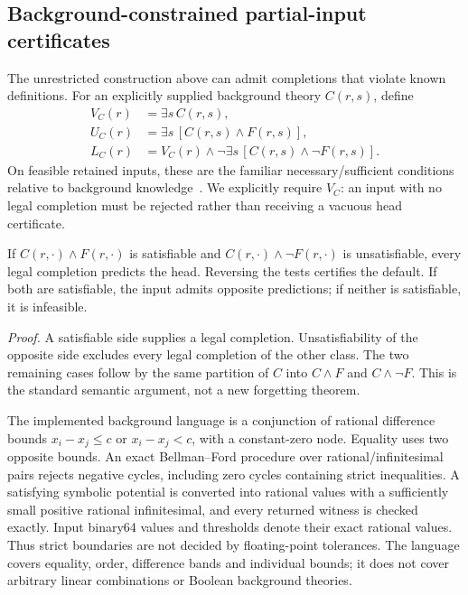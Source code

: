 \subsection{Background-constrained partial-input certificates}\label{sec:contextual-forgetting}
The unrestricted construction above can admit completions that violate known definitions. For an explicitly supplied background theory $C(r,s)$, define
\begin{align}
 V_C(r)&=\exists s\,C(r,s),\\
 U_C(r)&=\exists s\,[C(r,s)\land F(r,s)],\\
 L_C(r)&=V_C(r)\land\neg\exists s\,[C(r,s)\land\neg F(r,s)].
\end{align}
On feasible retained inputs, these are the familiar necessary/sufficient conditions relative to background knowledge~\citep{doherty2024dualforgetting}. We explicitly require $V_C$: an input with no legal completion must be rejected rather than receiving a vacuous head certificate.

\begin{proposition}
If $C(r,\cdot)\land F(r,\cdot)$ is satisfiable and $C(r,\cdot)\land\neg F(r,\cdot)$ is unsatisfiable, every legal completion predicts the head. Reversing the tests certifies the default. If both are satisfiable, the input admits opposite predictions; if neither is satisfiable, it is infeasible.
\end{proposition}
\noindent\emph{Proof.} A satisfiable side supplies a legal completion. Unsatisfiability of the opposite side excludes every legal completion of the other class. The two remaining cases follow by the same partition of $C$ into $C\land F$ and $C\land\neg F$. This is the standard semantic argument, not a new forgetting theorem.

The implemented background language is a conjunction of rational difference bounds $x_i-x_j\leq c$ or $x_i-x_j<c$, with a constant-zero node. Equality uses two opposite bounds. An exact Bellman--Ford procedure over rational/infinitesimal pairs rejects negative cycles, including zero cycles containing strict inequalities. A satisfying symbolic potential is converted into rational values with a sufficiently small positive rational infinitesimal, and every returned witness is checked exactly. Input binary64 values and thresholds denote their exact rational values. Thus strict boundaries are not decided by floating-point tolerances. The language covers equality, order, difference bands and individual bounds; it does not cover arbitrary linear combinations or Boolean background theories.

